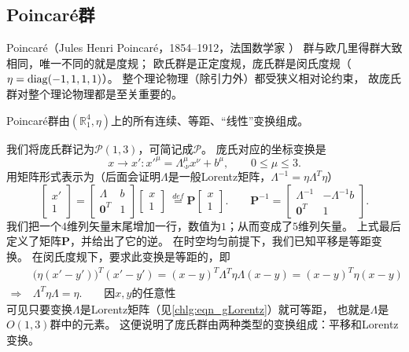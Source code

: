 \subsection{Poincar\'{e}群}\label{chlg:sec_Poincare-group}
Poincar\'{e}（Jules Henri Poincar\'e，1854--1912，法国数学家 ）
群与欧几里得群大致相同，唯一不同的就是度规；
欧氏群是正定度规，庞氏群是闵氏度规（$\eta={\rm diag}(-1,1,1,1)$）。
整个理论物理（除引力外）都受狭义相对论约束，
故庞氏群对整个理论物理都是至关重要的。
\begin{definition}
    Poincar\'{e}群由$(\mathbb{R}^4_1,\eta)$上的所有连续、等距、“线性”变换组成。
\end{definition}
我们将庞氏群记为$\mathcal{P}(1,3)$，可简记成$\mathcal{P}$。
庞氏对应的坐标变换是
\begin{equation}\label{chlg:eqn_xpoincare}
    x\to x' : x'^{\mu} = \Lambda^\mu_{\cdot \nu }x^\nu + b^\mu ,\qquad  0 \leqslant \mu \leqslant 3 .
\end{equation}
用矩阵形式表示为（后面会证明$\Lambda$是一般Lorentz矩阵，$\Lambda^{-1}=\eta \Lambda^T \eta$）
\begin{equation}\label{chlg:eqn_xP5m}
    \begin{bmatrix}  x' \\ 1 \end{bmatrix} =
    \begin{bmatrix}  \Lambda & b \\ \boldsymbol{0}^T & 1  \end{bmatrix}
    \begin{bmatrix}  x \\ 1 \end{bmatrix} 
    \  \overset{def}{=} \boldsymbol{P} \begin{bmatrix}  x \\ 1 \end{bmatrix} .
    \qquad \boldsymbol{P}^{-1} = 
    \begin{bmatrix}    \Lambda^{-1} & -\Lambda^{-1} b \\ \boldsymbol{0}^T & 1    \end{bmatrix} .
\end{equation}
我们把一个$4$维列矢量末尾增加一行，数值为$1$；从而变成了$5$维列矢量。
上式最后定义了矩阵$\boldsymbol{P}$，并给出了它的逆。
在时空均匀前提下，我们已知平移是等距变换。
在闵氏度规下，要求此变换是等距的，即
    \begin{align*}
        &\bigl(\eta(x'-y')\bigr)^T (x'-y') = ( x - y )^T \Lambda^T \eta \Lambda ( x - y )= (x-y)^T \eta (x-y)\\
        \Rightarrow\ &\Lambda^T \eta \Lambda = \eta .     \qquad \text{因}x,y \text{的任意性}
    \end{align*}
可见只要变换$\Lambda$是Lorentz矩阵（见\eqref{chlg:eqn_gLorentz}）就可等距，
也就是$\Lambda$是$O(1,3)$群中的元素。
这便说明了庞氏群由两种类型的变换组成：平移和Lorentz变换。

